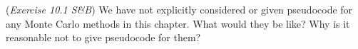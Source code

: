 (\textit{Exercise 10.1 S\&B})
We have not explicitly considered or given pseudocode for any Monte Carlo
methods in this chapter. What would they be like? Why is it reasonable not to give
pseudocode for them? 
